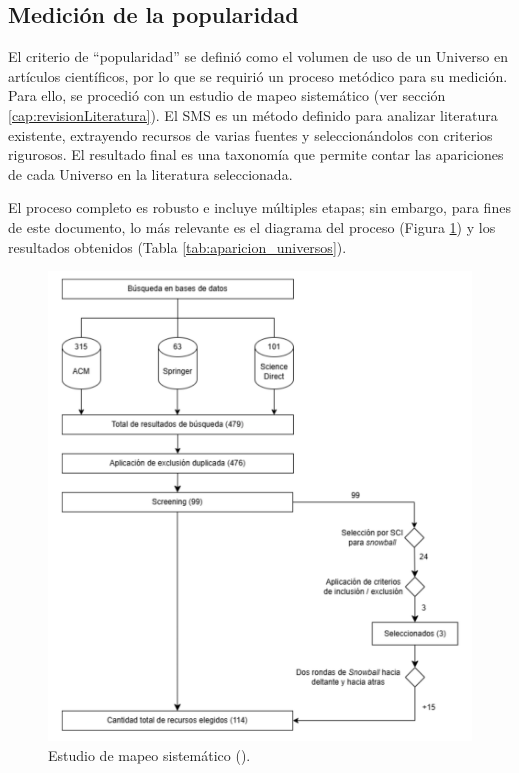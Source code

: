\subsection{Medición de la popularidad}
El criterio de ``popularidad'' se definió como el volumen de uso de un Universo en artículos científicos, por lo que se requirió un proceso metódico para su medición. Para ello, se procedió con un estudio de mapeo sistemático \SMS (ver sección \ref{cap:revisionLiteratura}). El SMS es un método definido para analizar literatura existente, extrayendo recursos de varias fuentes y seleccionándolos con criterios rigurosos. El resultado final es una taxonomía que permite contar las apariciones de cada Universo en la literatura seleccionada.

El proceso completo es robusto e incluye múltiples etapas; sin embargo, para fines de este documento, lo más relevante es el diagrama del proceso (Figura \ref{fig:sms}) y los resultados obtenidos (Tabla \ref{tab:aparicion_universos}).


\begin{figure}[H]
	\centering
	\includegraphics[scale=0.4]{tablas-images/dar/resumen-mapeo.png}
	\caption{Estudio de mapeo sistemático (\SMS).}
	\label{fig:sms}
\end{figure}

